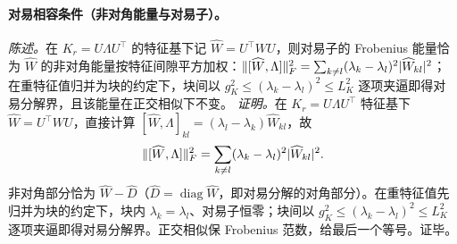 \documentclass[fontset=windows,11pt]{ctexart}
\DeclarePairedDelimiter{\norm}{\lVert}{\rVert}
\newcommand{\W}{W}
\DeclareMathOperator{\diag}{diag}
\numberwithin{equation}{section}
\begin{document}
\paragraph{对易相容条件（非对角能量与对易子）。}
\emph{陈述。}在 $K_r=U\Lambda U^\top$ 的特征基下记 $\widehat\W=U^\top\W U$，则对易子的 Frobenius 能量恰为 $\widehat\W$ 的非对角能量按特征间隙平方加权：$\norm{[\widehat\W,\Lambda]}_F^2=\sum_{k\ne l}(\lambda_k-\lambda_l)^2|\widehat\W_{kl}|^2$；在重特征值归并为块的约定下，块间以 $g_K^2\le(\lambda_k-\lambda_l)^2\le L_K^2$ 逐项夹逼即得对易分解界，且该能量在正交相似下不变。
\emph{证明。}在 $K_r=U\Lambda U^\top$ 特征基下 $\widehat\W=U^\top\W U$，直接计算 $[\widehat\W,\Lambda]_{kl}=(\lambda_l-\lambda_k)\widehat\W_{kl}$，故
\[
\norm{[\widehat\W,\Lambda]}_F^2=\sum_{k\ne l}(\lambda_k-\lambda_l)^2|\widehat\W_{kl}|^2.
\]
非对角部分恰为 $\widehat\W-\widehat D$（$\widehat D=\diag\widehat\W$，即对易分解的对角部分）。在重特征值先归并为块的约定下，块内 $\lambda_k=\lambda_l$、对易子恒零；块间以 $g_K^2\le(\lambda_k-\lambda_l)^2\le L_K^2$ 逐项夹逼即得对易分解界。正交相似保 Frobenius 范数，给最后一个等号。证毕。
\end{document}
